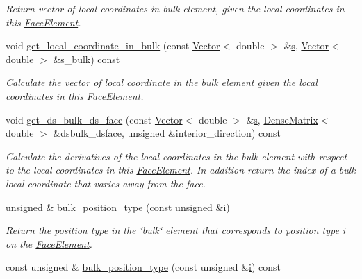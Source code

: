 \begin{DoxyCompactItemize}
\begin{DoxyCompactList}\small\item\em Return vector of local coordinates in bulk element, given the local coordinates in this \hyperlink{classoomph_1_1FaceElement}{Face\+Element}. \end{DoxyCompactList}\item 
void \hyperlink{classoomph_1_1FaceElement_aced9ec5b182220c0f50b1714638ee8f3}{get\+\_\+local\+\_\+coordinate\+\_\+in\+\_\+bulk} (const \hyperlink{classoomph_1_1Vector}{Vector}$<$ double $>$ \&\hyperlink{cfortran_8h_ab7123126e4885ef647dd9c6e3807a21c}{s}, \hyperlink{classoomph_1_1Vector}{Vector}$<$ double $>$ \&s\+\_\+bulk) const
\begin{DoxyCompactList}\small\item\em Calculate the vector of local coordinate in the bulk element given the local coordinates in this \hyperlink{classoomph_1_1FaceElement}{Face\+Element}. \end{DoxyCompactList}\item 
void \hyperlink{classoomph_1_1FaceElement_ac1e67f910b557da8ef2eb68977c17cad}{get\+\_\+ds\+\_\+bulk\+\_\+ds\+\_\+face} (const \hyperlink{classoomph_1_1Vector}{Vector}$<$ double $>$ \&\hyperlink{cfortran_8h_ab7123126e4885ef647dd9c6e3807a21c}{s}, \hyperlink{classoomph_1_1DenseMatrix}{Dense\+Matrix}$<$ double $>$ \&dsbulk\+\_\+dsface, unsigned \&interior\+\_\+direction) const
\begin{DoxyCompactList}\small\item\em Calculate the derivatives of the local coordinates in the bulk element with respect to the local coordinates in this \hyperlink{classoomph_1_1FaceElement}{Face\+Element}. In addition return the index of a bulk local coordinate that varies away from the face. \end{DoxyCompactList}\item 
unsigned \& \hyperlink{classoomph_1_1FaceElement_a0800385f7d11703d4bbae06e1c322b04}{bulk\+\_\+position\+\_\+type} (const unsigned \&\hyperlink{cfortran_8h_adb50e893b86b3e55e751a42eab3cba82}{i})
\begin{DoxyCompactList}\small\item\em Return the position type in the \char`\"{}bulk\char`\"{} element that corresponds to position type i on the \hyperlink{classoomph_1_1FaceElement}{Face\+Element}. \end{DoxyCompactList}\item 
const unsigned \& \hyperlink{classoomph_1_1FaceElement_aa99f478e771d753e93cc748caf0e5302}{bulk\+\_\+position\+\_\+type} (const unsigned \&\hyperlink{cfortran_8h_adb50e893b86b3e55e751a42eab3cba82}{i}) const

\end{DoxyCompactItemize}
